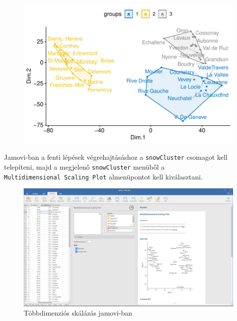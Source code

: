 \documentclass[
  letterpaper,
]{krantz}
\begin{document}
\begin{figure}[H]

{\centering \includegraphics{./sec_tobbdimenzios_skalazas_files/figure-pdf/unnamed-chunk-4-1.pdf}

}

\end{figure}

Jamovi-ban a fenti lépések végrehajtásáshoz a \texttt{snowCluster}
csomagot kell telepíteni, majd a megjelenő \texttt{snowCluster} menüből
a \texttt{Multidimensional\ Scaling\ Plot} almenüpontot kell
kiválasztani.

\begin{figure}

{\centering \includegraphics{./images/mds_swiss_kep_01.jpg}

}

\caption{Többdimenziós skálázás jamovi-ban}

\end{figure}
\end{document}
